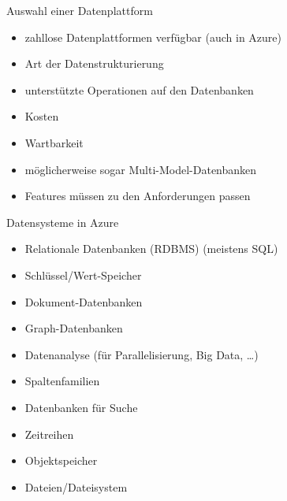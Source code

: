 

\begin{flashcard}[Definition]{Auswahl einer Datenplattform}
  \begin{itemize}
    \item zahllose Datenplattformen verfügbar (auch in Azure)
    \item Art der Datenstrukturierung
    \item unterstützte Operationen auf den Datenbanken
    \item Kosten
    \item Wartbarkeit
    \item möglicherweise sogar Multi-Model-Datenbanken
    \item Features müssen zu den Anforderungen passen
  \end{itemize}
\end{flashcard}

\begin{flashcard}[Definition]{Datensysteme in Azure}
  \begin{itemize}
    \item Relationale Datenbanken (RDBMS) (meistens SQL)
    \item Schlüssel/Wert-Speicher
    \item Dokument-Datenbanken
    \item Graph-Datenbanken
    \item Datenanalyse (für Parallelisierung, Big Data, \ldots)
    \item Spaltenfamilien
    \item Datenbanken für Suche
    \item Zeitreihen
    \item Objektspeicher
    \item Dateien/Dateisystem
  \end{itemize}
\end{flashcard}

